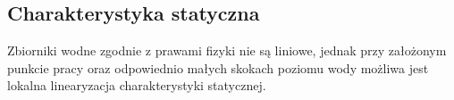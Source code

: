 \subsection{Charakterystyka statyczna}
\label{lab:zad9}


Zbiorniki wodne zgodnie z prawami fizyki nie są liniowe, jednak przy założonym
punkcie pracy oraz odpowiednio małych skokach poziomu wody
możliwa jest lokalna linearyzacja charakterystyki statycznej.

\newpage

